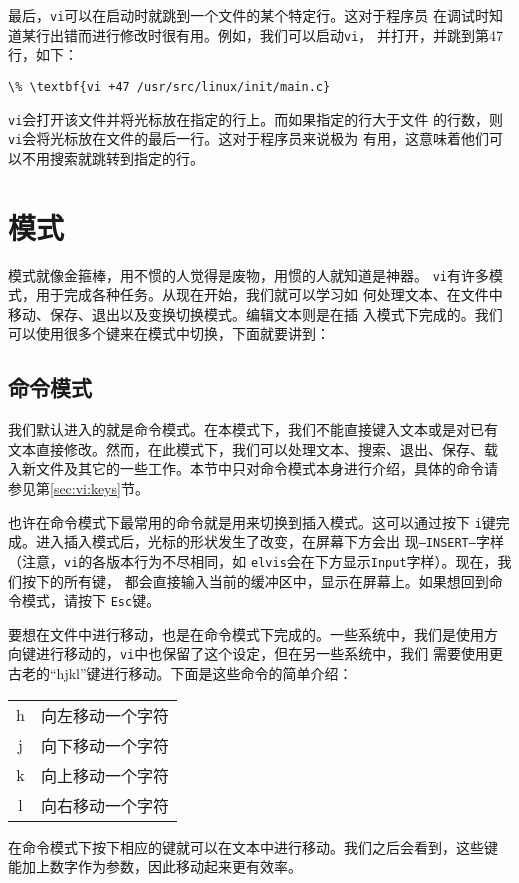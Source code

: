 最后，\texttt{vi}可以在启动时就跳到一个文件的某个特定行。这对于程序员
在调试时知道某行出错而进行修改时很有用。例如，我们可以启动\texttt{vi}，
并打开，并跳到第47行，如下：
\begin{Verbatim}[frame=single,commandchars=\\\{\}]
\% \textbf{vi +47 /usr/src/linux/init/main.c}
\end{Verbatim}
\texttt{vi}会打开该文件并将光标放在指定的行上。而如果指定的行大于文件
的行数，则\texttt{vi}会将光标放在文件的最后一行。这对于程序员来说极为
有用，这意味着他们可以不用搜索就跳转到指定的行。


\section{模式}
\label{sec:vi:modes}
模式就像金箍棒，用不惯的人觉得是废物，用惯的人就知道是神器。
\texttt{vi}有许多模式，用于完成各种任务。从现在开始，我们就可以学习如
何处理文本、在文件中移动、保存、退出以及变换切换模式。编辑文本则是在插
入模式下完成的。我们可以使用很多个键来在模式中切换，下面就要讲到：

\subsection{命令模式}
\label{sec:vi:modes:command}
我们默认进入的就是命令模式。在本模式下，我们不能直接键入文本或是对已有
文本直接修改。然而，在此模式下，我们可以处理文本、搜索、退出、保存、载
入新文件及其它的一些工作。本节中只对命令模式本身进行介绍，具体的命令请
参见第\ref{sec:vi:keys}节。

也许在命令模式下最常用的命令就是用来切换到插入模式。这可以通过按下
\texttt{i}键完成。进入插入模式后，光标的形状发生了改变，在屏幕下方会出
现\texttt{--INSERT--}字样（注意，\texttt{vi}的各版本行为不尽相同，如
\texttt{elvis}会在下方显示\texttt{Input}字样）。现在，我们按下的所有键，
都会直接输入当前的缓冲区中，显示在屏幕上。如果想回到命令模式，请按下
\texttt{Esc}键。

要想在文件中进行移动，也是在命令模式下完成的。一些系统中，我们是使用方
向键进行移动的，\texttt{vi}中也保留了这个设定，但在另一些系统中，我们
需要使用更古老的``hjkl''键进行移动。下面是这些命令的简单介绍：
\begin{table}[ht]
  \centering
  \begin{tabular}{c|l}
  \hline\hline
  h & 向左移动一个字符 \\
  j & 向下移动一个字符 \\
  k & 向上移动一个字符 \\
  l & 向右移动一个字符 \\ 
  \hline\hline
\end{tabular}
\end{table}
在命令模式下按下相应的键就可以在文本中进行移动。我们之后会看到，这些键
能加上数字作为参数，因此移动起来更有效率。

